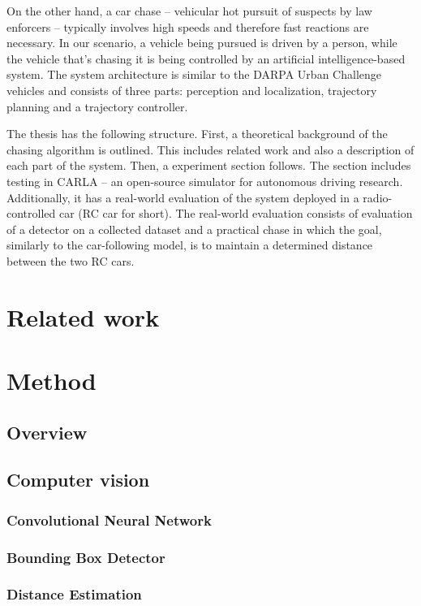  
On the other hand, a car chase -- vehicular hot pursuit of suspects by law enforcers -- typically involves high speeds and therefore fast reactions are necessary. In our scenario, a vehicle being pursued is driven by a person, while the vehicle that's chasing it is being controlled by an artificial intelligence-based system. The system architecture is similar to the DARPA Urban Challenge vehicles \cite{Bertha}\cite{darpa2}\cite{darpa_book} and consists of three parts: perception and localization, trajectory planning and a trajectory controller. \par


The thesis has the following structure. First, a theoretical background of the chasing algorithm is outlined. This includes related work and also a description of each part of the system. Then, a experiment section follows. The section includes testing in CARLA -- an open-source simulator for autonomous driving research. Additionally, it has a real-world evaluation of the system deployed in a radio-controlled car (RC car for short). The real-world evaluation consists of evaluation of a detector on a collected dataset and a practical chase in which the goal, similarly to the car-following model, is to maintain a determined distance between the two RC cars.

\chapter{Related work}

\chapter{Method}
\section{Overview}

\section{Computer vision}
\subsection{Convolutional Neural Network}
\subsection{Bounding Box Detector}
\subsection{Distance Estimation}
